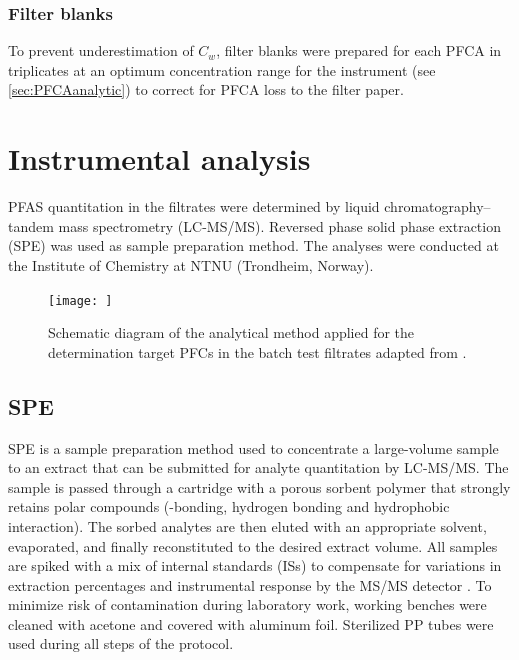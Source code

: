 \subsubsection{Filter blanks}
To prevent underestimation of $C_w$, filter blanks were prepared for each PFCA in triplicates at an optimum concentration range for the instrument (see \cref{sec:PFCAanalytic}) to correct for PFCA loss to the filter paper. 


\section{Instrumental analysis} \label{methods:instrAnalysis}
PFAS quantitation in the filtrates were determined by liquid chromatography--tandem mass spectrometry (LC-MS/MS). Reversed phase solid phase extraction (SPE) was used as sample preparation method. The analyses were conducted at the Institute of Chemistry at NTNU (Trondheim, Norway).

\begin{figure}
    \centering
    \texttt{[image: ]}
    \caption{Schematic diagram of the analytical method applied for the determination target PFCs in the batch test filtrates adapted from \citep{arvaniti2012diagram}.}
    \label{fig:analyticalMethod}
\end{figure}

\subsection{SPE}
SPE is a sample preparation method used to concentrate a large-volume sample to an extract that can be submitted for analyte quantitation by LC-MS/MS. The sample is passed through a cartridge with a porous sorbent polymer that strongly retains polar compounds (\textpi-\textpi bonding, hydrogen bonding and hydrophobic interaction). The sorbed analytes are then eluted with an appropriate solvent, evaporated, and finally reconstituted to the desired extract volume. All samples are spiked with a mix of internal standards (ISs) to compensate for variations in extraction percentages and instrumental response by the MS/MS detector \citep{arvaniti2014}. To minimize risk of contamination during laboratory work, working benches were cleaned with acetone and covered with aluminum foil. Sterilized PP tubes were used during all steps of the protocol.

